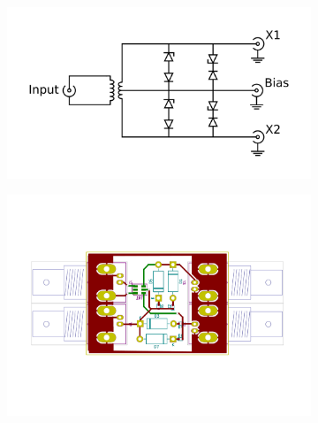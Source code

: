 \begin{figure}[ht]
	\centering
	\begin{subfigure}{0.4\textwidth}
		\centering
		\includegraphics[width=\textwidth]{Chapters/Deflection/circuit_CTT}
		\caption{}
		\label{fig:circuit_ctt}
	\end{subfigure}
	\hspace{0.1\textwidth}
	\begin{subfigure}{0.4\textwidth}
		\centering
		\includegraphics[width=\textwidth]{Chapters/Deflection/PCB_CTT3}
		\caption{}
		\label{fig:PCB_CTT}
	\end{subfigure}
	\caption{}
	\label{fig:CTT}
\end{figure}



